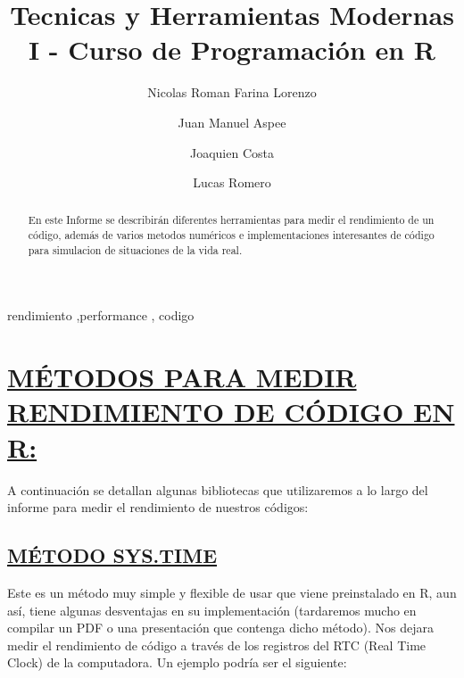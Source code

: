 \documentclass[preprint, 3p,
authoryear]{elsarticle} %
\begin{document}
\begin{frontmatter}

  \title{Tecnicas y Herramientas Modernas I - Curso de Programación en
R}
    \author[Universidad Nacional de Cuyo]{Nicolas Roman Farina Lorenzo%
  }
    \author[Universidad Nacional de Cuyo]{Juan Manuel Aspee}
    \author[Universidad Nacional de Cuyo]{Joaquien Costa%
  }
    \author[Universidad Nacional de Cuyo]{Lucas Romero%
  }
  
  \begin{abstract}
  En este Informe se describirán diferentes herramientas para medir el
  rendimiento de un código, además de varios metodos numéricos e
  implementaciones interesantes de código para simulacion de situaciones
  de la vida real.
  \end{abstract}
    \begin{keyword}
    rendimiento \sep performance \sep 
    codigo
  \end{keyword}
  
 \end{frontmatter}

\hypertarget{muxe9todos-para-medir-rendimiento-de-cuxf3digo-en-r}{%
\section{\texorpdfstring{\uline{\textbf{MÉTODOS PARA MEDIR RENDIMIENTO
DE CÓDIGO EN
R:}}}{MÉTODOS PARA MEDIR RENDIMIENTO DE CÓDIGO EN R:}}\label{muxe9todos-para-medir-rendimiento-de-cuxf3digo-en-r}}

A continuación se detallan algunas bibliotecas que utilizaremos a lo
largo del informe para medir el rendimiento de nuestros códigos:

\hypertarget{muxe9todo-sys.time}{%
\subsection{\texorpdfstring{\uline{\textbf{MÉTODO
SYS.TIME}}}{MÉTODO SYS.TIME}}\label{muxe9todo-sys.time}}

Este es un método muy simple y flexible de usar que viene preinstalado
en R, aun así, tiene algunas desventajas en su implementación
(tardaremos mucho en compilar un PDF o una presentación que contenga
dicho método). Nos dejara medir el rendimiento de código a través de los
registros del RTC (Real Time Clock) de la computadora. Un ejemplo podría
ser el siguiente:
\end{document}
